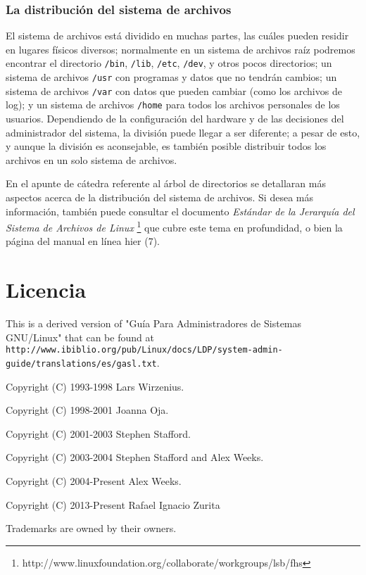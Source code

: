 \documentclass[12pt]{article}
\begin{document}
\subsubsection{ La distribución del sistema de archivos}



 El sistema de archivos está dividido en muchas partes, las cuáles pueden residir
en lugares físicos diversos; normalmente en un sistema de archivos raíz podremos 
encontrar el directorio \texttt{/bin}, \texttt{/lib}, \texttt{/etc}, \texttt{/dev},
y otros pocos directorios; un sistema de archivos \texttt{/usr} con programas y datos que
no tendrán cambios; un sistema de archivos \texttt{/var} con datos que pueden cambiar
(como los archivos de log); y un sistema de archivos \texttt{/home}
para todos los archivos personales de los usuarios. Dependiendo de la
configuración del hardware y de las decisiones del administrador del sistema, la
división puede llegar a ser diferente; a pesar de esto, y aunque la división es
aconsejable, es también posible distribuir todos los archivos en un solo sistema
de archivos.  

 En el apunte de cátedra referente al árbol de directorios se detallaran más 
aspectos acerca de la distribución del sistema de archivos. Si desea más información,
también puede consultar el documento \textit{Estándar de la Jerarquía del Sistema de Archivos
de Linux} 
\footnote{http://www.linuxfoundation.org/collaborate/workgroups/lsb/fhs}
que cubre este tema en profundidad, o bien la página del manual en línea hier (7).

\section{Licencia}
This is a derived version of "Guía Para Administradores de Sistemas GNU/Linux" that 
can be found at \\ \texttt{http://www.ibiblio.org/pub/Linux/docs/LDP/system-admin-guide/translations/es/gasl.txt}.

Copyright (C) 1993-1998 Lars Wirzenius.

Copyright (C) 1998-2001 Joanna Oja.

Copyright (C) 2001-2003 Stephen Stafford.

Copyright (C) 2003-2004 Stephen Stafford and Alex Weeks.

Copyright (C) 2004-Present Alex Weeks.

Copyright (C) 2013-Present Rafael Ignacio Zurita

Trademarks are owned by their owners.
\end{document}
